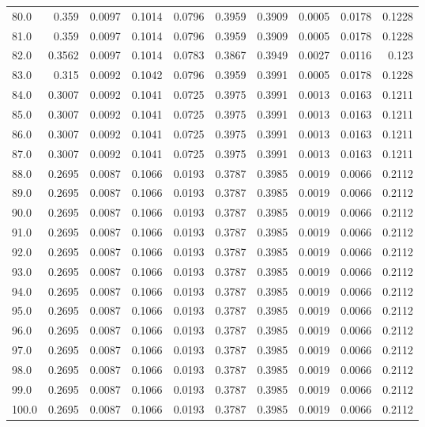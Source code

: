 \begin{longtable}{lrrrrrrrrr}
80.0 & 0.359 & 0.0097 & 0.1014 & 0.0796 & 0.3959 & 0.3909 & 0.0005 & 0.0178 & 0.1228 \\
81.0 & 0.359 & 0.0097 & 0.1014 & 0.0796 & 0.3959 & 0.3909 & 0.0005 & 0.0178 & 0.1228 \\
82.0 & 0.3562 & 0.0097 & 0.1014 & 0.0783 & 0.3867 & 0.3949 & 0.0027 & 0.0116 & 0.123 \\
83.0 & 0.315 & 0.0092 & 0.1042 & 0.0796 & 0.3959 & 0.3991 & 0.0005 & 0.0178 & 0.1228 \\
84.0 & 0.3007 & 0.0092 & 0.1041 & 0.0725 & 0.3975 & 0.3991 & 0.0013 & 0.0163 & 0.1211 \\
85.0 & 0.3007 & 0.0092 & 0.1041 & 0.0725 & 0.3975 & 0.3991 & 0.0013 & 0.0163 & 0.1211 \\
86.0 & 0.3007 & 0.0092 & 0.1041 & 0.0725 & 0.3975 & 0.3991 & 0.0013 & 0.0163 & 0.1211 \\
87.0 & 0.3007 & 0.0092 & 0.1041 & 0.0725 & 0.3975 & 0.3991 & 0.0013 & 0.0163 & 0.1211 \\
88.0 & 0.2695 & 0.0087 & 0.1066 & 0.0193 & 0.3787 & 0.3985 & 0.0019 & 0.0066 & 0.2112 \\
89.0 & 0.2695 & 0.0087 & 0.1066 & 0.0193 & 0.3787 & 0.3985 & 0.0019 & 0.0066 & 0.2112 \\
90.0 & 0.2695 & 0.0087 & 0.1066 & 0.0193 & 0.3787 & 0.3985 & 0.0019 & 0.0066 & 0.2112 \\
91.0 & 0.2695 & 0.0087 & 0.1066 & 0.0193 & 0.3787 & 0.3985 & 0.0019 & 0.0066 & 0.2112 \\
92.0 & 0.2695 & 0.0087 & 0.1066 & 0.0193 & 0.3787 & 0.3985 & 0.0019 & 0.0066 & 0.2112 \\
93.0 & 0.2695 & 0.0087 & 0.1066 & 0.0193 & 0.3787 & 0.3985 & 0.0019 & 0.0066 & 0.2112 \\
94.0 & 0.2695 & 0.0087 & 0.1066 & 0.0193 & 0.3787 & 0.3985 & 0.0019 & 0.0066 & 0.2112 \\
95.0 & 0.2695 & 0.0087 & 0.1066 & 0.0193 & 0.3787 & 0.3985 & 0.0019 & 0.0066 & 0.2112 \\
96.0 & 0.2695 & 0.0087 & 0.1066 & 0.0193 & 0.3787 & 0.3985 & 0.0019 & 0.0066 & 0.2112 \\
97.0 & 0.2695 & 0.0087 & 0.1066 & 0.0193 & 0.3787 & 0.3985 & 0.0019 & 0.0066 & 0.2112 \\
98.0 & 0.2695 & 0.0087 & 0.1066 & 0.0193 & 0.3787 & 0.3985 & 0.0019 & 0.0066 & 0.2112 \\
99.0 & 0.2695 & 0.0087 & 0.1066 & 0.0193 & 0.3787 & 0.3985 & 0.0019 & 0.0066 & 0.2112 \\
100.0 & 0.2695 & 0.0087 & 0.1066 & 0.0193 & 0.3787 & 0.3985 & 0.0019 & 0.0066 & 0.2112 \\

\end{longtable}
